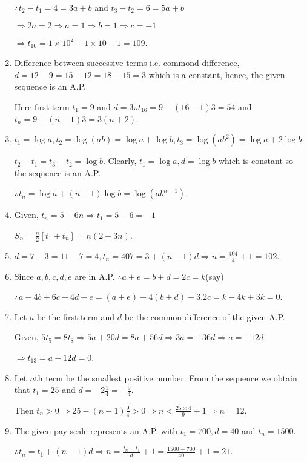 \begin{enumerate}
  $\therefore t_2 - t_1 = 4 = 3a + b$ and $t_3 - t_2 = 6 = 5a + b$

  $\Rightarrow 2a = 2 \Rightarrow a = 1 \Rightarrow b = 1 \Rightarrow c = -1$

  $\Rightarrow t_{10} = 1\times10^2 + 1\times10 - 1 = 109$.
\item Difference between successive terms i.e. commond difference, $d = 12 - 9 = 15 - 12 = 18 - 15 = 3$ which is a constant, hence,
  the given sequence is an A.P.

  Here first term $t_1 = 9$ and $d = 3 \therefore t_{16} = 9 + (16 - 1)3 = 54$ and $t_n = 9 + (n - 1)3 = 3(n + 2)$.
\item $t_1 = \log a, t_2 = \log(ab) = \log a + \log b, t_3 = \log(ab^2) = \log a + 2\log b$

  $t_2 - t_1 = t_3 - t_2 = \log b$. Clearly, $t_1 = \log a, d = \log b$ which is constant so the sequence is an A.P.

  $\therefore t_n = \log a + (n - 1)\log b = \log(ab^{n - 1})$.
\item Given, $t_n = 5 - 6n \Rightarrow t_1 = 5 - 6 = -1$

  $S_n = \frac{n}{2}[t_1 + t_n] = n(2 - 3n)$.
\item $d = 7 - 3 = 11 -7 = 4, t_n = 407 = 3 + (n - 1)d \Rightarrow n = \frac{404}{4} + 1 = 102$.
\item Since $a, b, c, d, e$ are in A.P. $\therefore a + e = b + d = 2c = k$(say)

  $\therefore a - 4b + 6c - 4d + e = (a + e) - 4(b + d) + 3.2c = k - 4k + 3k = 0$.
\item Let $a$ be the first term and $d$ be the common difference of the given A.P.

  Given, $5t_5 = 8t_8 \Rightarrow 5a + 20d = 8a + 56d \Rightarrow 3a = -36d \Rightarrow a = -12d$

  $\Rightarrow t_{13} = a + 12d = 0$.
\item Let $n$th term be the smallest positive number. From the sequence we obtain that $t_1 = 25$ and $d = -2\frac{1}{4} = -\frac{9}{4}$.

  Then $t_n > 0 \Rightarrow 25 - (n - 1)\frac{9}{4} > 0\Rightarrow n < \frac{25\times4}{9} + 1 \Rightarrow n = 12$.
\item The given pay scale represents an A.P. with $t_1 = 700, d = 40$ and $t_n = 1500$.

  $\therefore t_n = t_1 + (n - 1)d \Rightarrow n = \frac{t_n - t_1}{d} + 1 = \frac{1500 - 700}{40} + 1 = 21$.


\end{enumerate}
